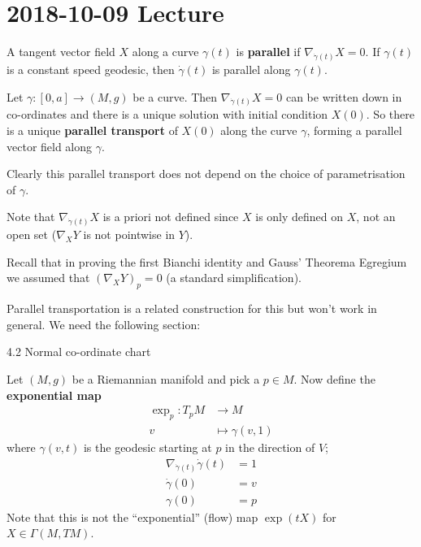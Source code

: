 \section{2018-10-09 Lecture}

\begin{rmk}[4.4]
  A tangent vector field $X$ along a curve $\gamma(t)$ is \textbf{parallel} if $\nabla_{\dot\gamma(t)}X=0$.
  If $\gamma(t)$ is a constant speed geodesic, then $\dot\gamma(t)$ is parallel along $\gamma(t)$.
\end{rmk}

\begin{exer}
  Let $\gamma: [0,a] \to (M,g)$ be a curve.
  Then $\nabla_{\dot\gamma(t)}X=0$ can be written down in co-ordinates and there is a unique solution with initial condition $X(0)$.
  So there is a unique \textbf{parallel transport} of $X(0)$ along the curve $\gamma$, forming a parallel vector field along $\gamma$.
\end{exer}

Clearly this parallel transport does not depend on the choice of parametrisation of $\gamma$.

\begin{rmk}
  Note that $\nabla_{\dot\gamma(t)}X$ is a priori not defined since $X$ is only defined on $X$, not an open set ($\nabla_XY$ is not pointwise in $Y$).
\end{rmk}

Recall that in proving the first Bianchi identity and Gauss' Theorema Egregium we assumed that $(\nabla_XY)_p=0$ (a standard simplification).

Parallel transportation is a related construction for this but won't work in general.
We need the following section:

4.2 Normal co-ordinate chart

Let $(M,g)$ be a Riemannian manifold and pick a $p\in M$.
Now define the \textbf{exponential map}
\begin{align*}
  \exp_p: T_pM &\to M \\
  v &\mapsto \gamma(v,1)
\end{align*}
where $\gamma(v,t)$ is the geodesic starting at $p$ in the direction of $V$;
\begin{align*}
  \nabla_{\dot\gamma(t)}\dot\gamma(t)&=1 \\
  \dot\gamma(0)&=v \\
  \gamma(0)&=p
\end{align*}
Note that this is not the ``exponential'' (flow) map $\exp(tX)$ for $X\in\Gamma(M,TM)$.

